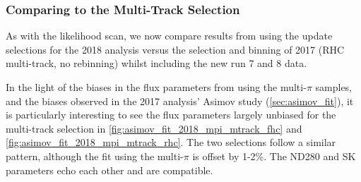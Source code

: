 \subsubsection{Comparing to the Multi-Track Selection}
As with the likelihood scan, we now compare results from using the update selections for the 2018 analysis versus the selection and binning of 2017 (RHC multi-track, no rebinning) whilst including the new run 7 and 8 data.

In the light of the biases in the flux parameters from using the multi-$\pi$ samples, and the biases observed in the 2017 analysis' Asimov study (\autoref{sec:asimov_fit}), it is particularly interesting to see the flux parameters largely unbiased for the multi-track selection in \autoref{fig:asimov_fit_2018_mpi_mtrack_fhc} and \autoref{fig:asimov_fit_2018_mpi_mtrack_rhc}. The two selections follow a similar pattern, although the fit using the multi-$\pi$ is offset by 1-2\%. The ND280 and SK parameters echo each other and are compatible.

